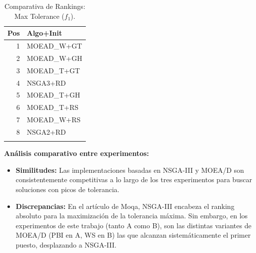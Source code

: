 \documentclass[a4paper,10pt]{article}
\begin{document}
\begin{table}[H]
\begin{minipage}[t]{0.32\textwidth}
        \begin{tabular}{rl}
            \toprule
            Pos & Algo+Init \\ \midrule
            1 & MOEAD\_W+GT \\
            2 & MOEAD\_W+GH \\
            3 & MOEAD\_T+GT \\
            4 & NSGA3+RD \\
            5 & MOEAD\_T+GH \\
            6 & MOEAD\_T+RS \\
            7 & MOEAD\_W+RS \\
            8 & NSGA2+RD \\
            \\
            \bottomrule
        \end{tabular}
    \end{minipage}
    \caption{Comparativa de Rankings: Max Tolerance ($f_1$).}
\end{table}

\textbf{Análisis comparativo entre experimentos:}
\begin{itemize}
    \item \textbf{Similitudes:} Las implementaciones basadas en NSGA-III y MOEA/D son consistentemente competitivas a lo largo de los tres experimentos para buscar soluciones con picos de tolerancia.
    \item \textbf{Discrepancias:} En el artículo de Moqa, NSGA-III encabeza el ranking absoluto para la maximización de la tolerancia máxima. Sin embargo, en los experimentos de este trabajo (tanto A como B), son las distintas variantes de MOEA/D (PBI en A, WS en B) las que alcanzan sistemáticamente el primer puesto, desplazando a NSGA-III.
\end{itemize}
\end{document}
